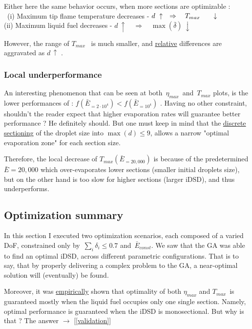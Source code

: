 \documentclass[12pt]{article}
\numberwithin{equation}{section}
\begin{document}
\begin{flushleft}
Either here the same behavior occurs, when more sections are optimizable : \\
\quad \, (i) Maximum tip flame temperature decreases - \hspace{9mm} $d \ \uparrow \quad \Rightarrow \quad T_{max} \hspace{6mm} \downarrow$ \\
\hspace{3.75mm} (ii) Maximum liquid fuel decreases - \hspace{30.5mm} $d \ \uparrow \quad \Rightarrow \quad \max(\bar{\delta}) \ \downarrow$

However, the range of $T_{max}$ \, is much smaller, and \underline{relative} differences are aggravated as $d \, \uparrow$ .

\subsubsection{Local underperformance}
An interesting phenomenon that can be seen at both \,$\eta_{max}$ \,and \,$T_{max}$ plots, is the lower performances of : $f(\bar{E}_{=2 \cdot 10^4}) < f(\bar{E}_{=10^4})$ . Having no other constraint, shouldn't the reader expect that higher evaporation rates will guarantee better performance ? He definitely should. But one must keep in mind that the \underline{discrete sectioning} of the droplet size into $\max{(d)} \leq 9$, allows a narrow "optimal evaporation zone" for each section size. 

Therefore, the local decrease of $T_{max}(\bar{E}_{=20,000})$ is because of the predetermined $\bar{E}=20,000$ which over-evaporates lower sections (smaller initial droplets size), but on the other hand is too slow for higher sections (larger iDSD), and thus underperforms.

\subsection{Optimization summary}
In this section I executed two optimization scenarios, each composed of a varied DoF, constrained only by \,$\sum_i \delta_i \leq 0.7$ and \,$\bar{E}_{const}$. We saw that the GA was able to find an optimal iDSD, across different parametric configurations. That is to say, that by properly delivering a complex problem to the GA, a near-optimal solution will (eventually) be found.

Moreover, it was \underline{empirically} shown that optimality of both  $\eta_{max}$ and $T_{max}$\, is guaranteed mostly when the liquid fuel occupies only one single section. Namely, optimal performance is guaranteed when the iDSD is monosectional. But why is that ? The answer $\rightarrow$ [\ref{validation}]


\end{flushleft}
\end{document}
